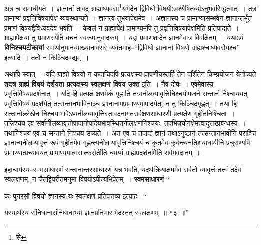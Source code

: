 \documentclass[article,12pt,a4paper]{memoir}
\begin{document}
	  \pstart अत्र च समाधीयते । ज्ञानानां तावद् ग्राह्याध्यवसा\footnote{से}\-यभेदेन द्विविधो विषयोऽवश्यैषितव्योऽनुभवसिद्धत्वात् । तत्र प्रामाण्यं प्रवृत्तिविषयापेक्षं व्यवस्थाप्यते । ज्ञानत्वं तूभयापेक्षमेव । अज्ञानस्य च प्रामाण्यासम्भवेन ज्ञानान्तर्भूतं प्रमाणं विषयद्वैविध्यवदेव भवति । केवलं न ग्राह्यापे\leavevmode{}क्षं प्रामाण्यमपि तु प्रवृत्तिविषयापेक्षमिति प्रतिपाद्यते । ग्राह्यापेक्षया तु प्रमाणस्येति वचनं स्वरूपानुवादकम् । यद्वा प्रमाणशब्देन ज्ञानमेवात्र विवक्षितम् । यथाऽयं \textbf{विनिश्चयटीकायां} स्वार्थानुमानव्याख्यानावसरे व्यक्तमाह--“द्विविधो ज्ञानानां विषयो ग्राह्यश्चाध्यवसेयश्च” इत्यादि । ततो न किञ्चिदवद्यम् ।
	\pend
      

	  \pstart अथापि स्यात् । यदि ग्राह्यो विषयो न कदाचिदपि प्रत्यक्षस्य प्रापणीयस्तर्हि तेन दर्शितेन किम्प्रयोजनं येनोच्यते \textbf{तदत्र ग्राह्यं विषयं दर्शयता प्रत्यक्षस्य स्वलक्षणं विषय उक्त} इति । नैष दोषः । एवमेवास्य प्रवृत्तिविषयप्रदर्शनात् । यदि हि प्रत्यक्षं क्षणमेकं गृह्णाति तत्रानीलव्यावृत्तिनिश्चयोपजने सन्तानं निश्चाययत् प्रवृत्तिविषयं प्रदर्शयेत् तत्सन्तानभाविनाञ्च ज्ञानानामप्रामाण्यमापादयेत्, न तु किञ्चिदगृह्णत् । तथा हि सन्तानोल्लेखेन निश्चयाभावेऽप्यनीलव्यावृत्तिस्तावदनागतसर्वक्षणसाधारणी प्रत्यक्षेण गृहीतनिश्चिता । तन्निश्चय एव सर्वानीलव्यावृत्तोपादानोपादेयभावस्थितनीलक्षणनिश्चयः, तदभिन्नयोगक्षेमत्वादुत्तरप्रबन्धस्य । तथानिश्चय एव च सन्ताने निश्चय उच्यते । अत एव च तदाद्यं ज्ञानं तथाऽनुष्ठानं तत्सन्तानभावीनि पराञ्चि ज्ञानान्यनीलव्यावृत्तं रूपं गृहीतमेव गृह्णन्त्यनीलव्यावृत्तिनिश्चयं च कृतमेव कुर्वन्त्यनतिशयाधायीनि प्रचुराण्यपि प्रामाण्यात्प्रच्यावयत् प्रामाण्यमात्मसात्करोतीति न्याय्यं ग्राह्यप्रदर्शनमिति सर्वमवदातम् ॥
	\pend
      

	  \pstart इहाचार्यस्य--स्वमसाधारणं सन्तानान्तरसाधारणं यन्न भवति, यदर्थक्रियाक्षममेव सर्वतो व्यावृत्तं तत्त्वं तदेव स्वलक्षणम्, न चैतद्विपरीतमनुमा विषयोऽपीत्यभिप्रेतम् । \textbf{स्वमसाधारणं} \leavevmode{} “
	  
	कः पुनरसौ विषयो ज्ञानस्य यः स्वलक्षणं प्रतिपत्तव्य इत्याह-- “
	  
	यस्यार्थस्य संनिधानासंनिधानाभ्यां ज्ञानप्रतिभासभेदस्तत् स्वलक्षणम् ॥ १३ ॥” 
	  
\end{document}
